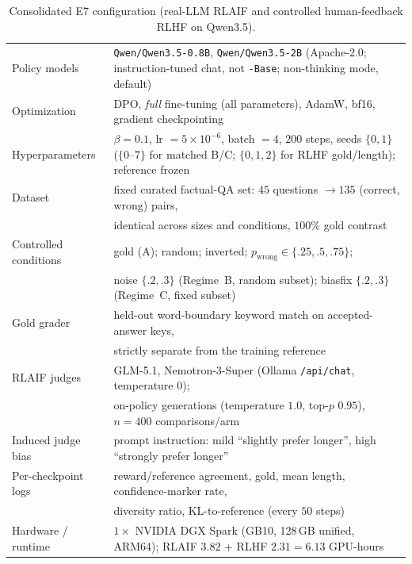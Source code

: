 \documentclass[10pt]{article} %
\theoremstyle{plain}
\theoremstyle{remark}
\begin{document}
\begin{table}[h]
\centering\small
\caption{Consolidated E7 configuration (real-LLM RLAIF and controlled human-feedback RLHF on Qwen3.5).}
\label{tab:e7-spec}
\begin{tabular}{ll}
\hline
Policy models & \texttt{Qwen/Qwen3.5-0.8B}, \texttt{Qwen/Qwen3.5-2B} (Apache-2.0; instruction-tuned chat, not \texttt{-Base}; non-thinking mode, default) \\
Optimization & DPO, \emph{full} fine-tuning (all parameters), AdamW, bf16, gradient checkpointing \\
Hyperparameters & $\beta=0.1$, lr $=5\times10^{-6}$, batch $=4$, $200$ steps, seeds $\{0,1\}$ ($\{0\text{--}7\}$ for matched B/C; $\{0,1,2\}$ for RLHF gold/length); reference frozen \\
Dataset & fixed curated factual-QA set: $45$ questions $\to 135$ (correct, wrong) pairs, \\
 & identical across sizes and conditions, $100\%$ gold contrast \\
Controlled conditions & gold (A); random; inverted; $p_{\mathrm{wrong}}\in\{.25,.5,.75\}$; \\
 & noise $\{.2,.3\}$ (Regime~B, random subset); biasfix $\{.2,.3\}$ (Regime~C, fixed subset) \\
Gold grader & held-out word-boundary keyword match on accepted-answer keys, \\
 & strictly separate from the training reference \\
RLAIF judges & GLM-5.1, Nemotron-3-Super (Ollama \texttt{/api/chat}, temperature $0$); \\
 & on-policy generations (temperature $1.0$, top-$p$ $0.95$), $n=400$ comparisons/arm \\
Induced judge bias & prompt instruction: mild ``slightly prefer longer'', high ``strongly prefer longer'' \\
Per-checkpoint logs & reward/reference agreement, gold, mean length, confidence-marker rate, \\
 & diversity ratio, KL-to-reference (every $50$ steps) \\
Hardware / runtime & $1\times$ NVIDIA DGX Spark (GB10, 128\,GB unified, ARM64); RLAIF $3.82$ + RLHF $2.31 = 6.13$ GPU-hours \\
\hline
\end{tabular}
\end{table}
\end{document}
